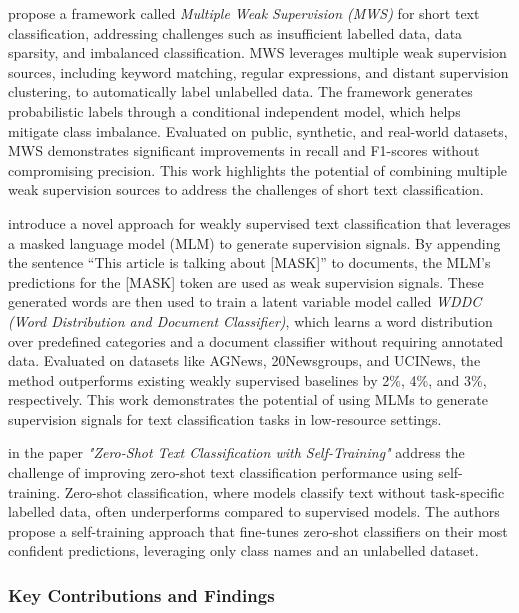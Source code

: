 \citet{chen_multiple_2022} propose a framework called \emph{Multiple Weak Supervision (MWS)} for short text classification, addressing challenges such as insufficient labelled data, data sparsity, and imbalanced classification. MWS leverages multiple weak supervision sources, including keyword matching, regular expressions, and distant supervision clustering, to automatically label unlabelled data. The framework generates probabilistic labels through a conditional independent model, which helps mitigate class imbalance. Evaluated on public, synthetic, and real-world datasets, MWS demonstrates significant improvements in recall and F1-scores without compromising precision. This work highlights the potential of combining multiple weak supervision sources to address the challenges of short text classification.
\newline

\citet{zeng_weakly_2022} introduce a novel approach for weakly supervised text classification that leverages a masked language model (MLM) to generate supervision signals. By appending the sentence ``This article is talking about [MASK]'' to documents, the MLM's predictions for the [MASK] token are used as weak supervision signals. These generated words are then used to train a latent variable model called \emph{WDDC (Word Distribution and Document Classifier)}, which learns a word distribution over predefined categories and a document classifier without requiring annotated data. Evaluated on datasets like AGNews, 20Newsgroups, and UCINews, the method outperforms existing weakly supervised baselines by 2\%, 4\%, and 3\%, respectively. This work demonstrates the potential of using MLMs to generate supervision signals for text classification tasks in low-resource settings.
\newline

\citet{gera_zero-shot_2022} in the paper \emph{"Zero-Shot Text Classification with Self-Training"} address the challenge of improving zero-shot text classification performance using self-training. Zero-shot classification, where models classify text without task-specific labelled data, often underperforms compared to supervised models. The authors propose a self-training approach that fine-tunes zero-shot classifiers on their most confident predictions, leveraging only class names and an unlabelled dataset.
\newline

\subsubsection*{Key Contributions and Findings}

